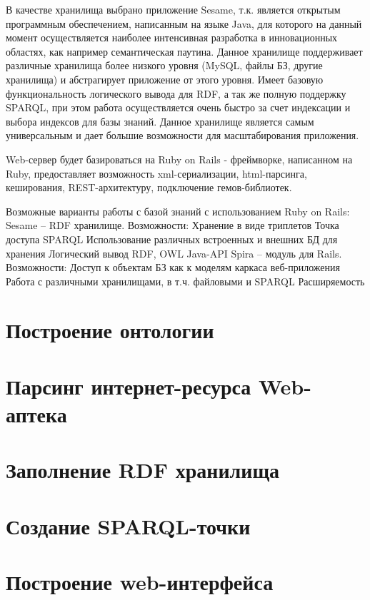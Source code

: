 \documentclass[specialist,subf,href,colorlinks=true
]{disser}
\begin{document}
В качестве хранилища выбрано приложение Sesame, т.к. является открытым программным обеспечением, написанным на языке Java, для которого на данный момент осуществляется наиболее интенсивная разработка в инновационных областях, как например семантическая паутина. Данное хранилище поддерживает различные хранилища более низкого уровня (MySQL, файлы БЗ, другие хранилища) и абстрагирует приложение от этого уровня. Имеет базовую функциональность логического вывода для  RDF, а так же полную поддержку SPARQL, при этом работа осуществляется очень быстро за счет индексации и выбора индексов для базы знаний. Данное хранилище является самым универсальным и дает большие возможности для масштабирования приложения.

Web-сервер будет базироваться на Ruby on Rails - фреймворке, написанном на Ruby, предоставляет возможность xml-сериализации, html-парсинга, кеширования, REST-архитектуру, подключение гемов-библиотек.

Возможные варианты работы с базой знаний с использованием Ruby on Rails:
Sesame – RDF хранилище. Возможности:
Хранение в виде триплетов
Точка доступа SPARQL
Использование различных встроенных и внешних БД для хранения
Логический вывод RDF, OWL
Java-API
Spira – модуль для Rails. Возможности:
Доступ к объектам БЗ как к моделям каркаса веб-приложения
Работа с различными хранилищами, в т.ч. файловыми и SPARQL
Расширяемость

\chapter{Построение онтологии}
\chapter{Парсинг интернет-ресурса Web-аптека}
\chapter{Заполнение RDF хранилища}
\chapter{Создание SPARQL-точки}
\chapter{Построение web-интерфейса}
\end{document}
